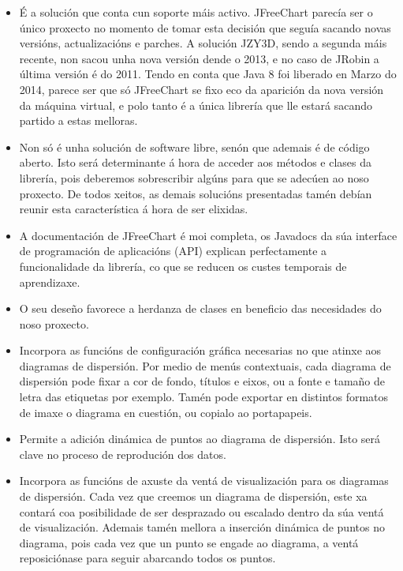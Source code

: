 \begin{itemize}
\item É a solución que conta cun soporte máis activo. JFreeChart parecía ser o único proxecto no momento de tomar esta decisión que seguía sacando novas versións, actualizacións e parches. A solución JZY3D, sendo a segunda máis recente, non sacou unha nova versión dende o 2013, e no caso de JRobin a última versión é do 2011. Tendo en conta que Java 8 foi liberado en Marzo do 2014, parece ser que só JFreeChart se fixo eco da aparición da nova versión da máquina virtual, e polo tanto é a única librería que lle estará sacando partido a estas melloras.
\item Non só é unha solución de software libre, senón que ademais é de código aberto. Isto será determinante á hora de acceder aos métodos e clases da librería, pois deberemos sobrescribir algúns para que se adecúen ao noso proxecto. De todos xeitos, as demais solucións presentadas tamén debían reunir esta característica á hora de ser elixidas.
\item A documentación de JFreeChart é moi completa, os Javadocs da súa interface de programación de aplicacións (API) explican perfectamente a funcionalidade da librería, co que se reducen os custes temporais de aprendizaxe.
\item O seu deseño favorece a herdanza de clases en beneficio das necesidades do noso proxecto.
\item Incorpora as funcións de configuración gráfica necesarias no que atinxe aos diagramas de dispersión. Por medio de menús contextuais, cada diagrama de dispersión pode fixar a cor de fondo, títulos e eixos, ou a fonte e tamaño de letra das etiquetas por exemplo. Tamén pode exportar en distintos formatos de imaxe o diagrama en cuestión, ou copialo ao portapapeis.
\item Permite a adición dinámica de puntos ao diagrama de dispersión. Isto será clave no proceso de reprodución dos datos.
\item Incorpora as funcións de axuste da ventá de visualización para os diagramas de dispersión. Cada vez que creemos un diagrama de dispersión, este xa contará coa posibilidade de ser desprazado ou escalado dentro da súa ventá de visualización. Ademais tamén mellora a inserción dinámica de puntos no diagrama, pois cada vez que un punto se engade ao diagrama, a ventá reposiciónase para seguir abarcando todos os puntos.
\end{itemize} 


